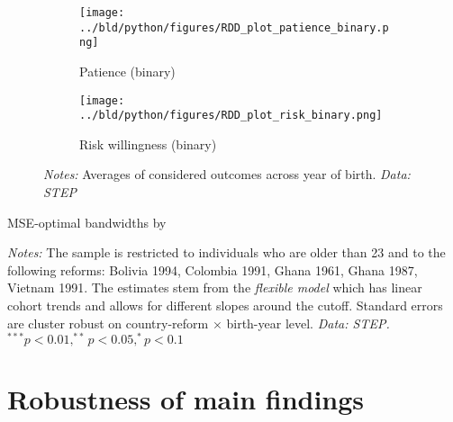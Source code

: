 \begin{figure}
	\begin{subfigure}{0.45\linewidth}
		\texttt{[image: ../bld/python/figures/RDD\_plot\_patience\_binary.png]}
		\caption{Patience (binary)}
	\end{subfigure}\hfill
	\begin{subfigure}{0.45\linewidth}
		\texttt{[image: ../bld/python/figures/RDD\_plot\_risk\_binary.png]}
		\caption{Risk willingness (binary)}
	\end{subfigure}

	\caption*{\footnotesize \textit{Notes:} Averages of considered outcomes across year of birth. \textit{Data: STEP}}
\end{figure}


\begin{table}[htbp]
	\caption{MSE-optimal bandwidths by \citet{calonico_rdrobust_2023}}
	\label{tab:bandwidth}
	\centering
	\begin{threeparttable}
		
		\begin{tablenotes}
			\footnotesize
			\item \textit{Notes:} The sample is restricted to individuals who are older than 23 and to the following reforms: Bolivia 1994, Colombia 1991, Ghana 1961, Ghana 1987, Vietnam 1991. The estimates stem from the \textit{flexible model} which has linear cohort trends and allows for different slopes around the cutoff. Standard errors are cluster robust on country-reform $\times$ birth-year level. \textit{Data: STEP.} $^{***} p < 0.01, ^{**} p < 0.05, ^{*} p < 0.1$
		\end{tablenotes}
	\end{threeparttable}
\end{table}



\newpage
\section{Robustness of main findings}
\setcounter{table}{0}
\setcounter{figure}{0}
\renewcommand{\thetable}{\Alph{section}.\arabic{table}}
\renewcommand\thefigure{\Alph{section}.\arabic{figure}}

